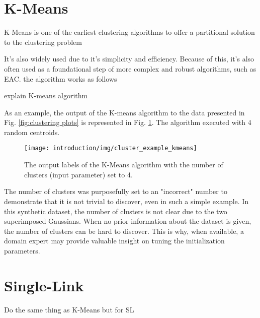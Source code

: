 \section{K-Means}

K-Means is one of the earliest clustering algorithms to offer a partitional solution to the clustering problem

It's also widely used due to it's simplicity and efficiency.
Because of this, it's also often used as a foundational step of more complex and robust algorithms, such as EAC.
 the algorithm works as follows

explain K-means algorithm

As an example, the output of the K-means algorithm to the data presented in Fig. \ref{fig:clustering plots} is represented in Fig. \ref{fig:intro kmeans}.
The algorithm executed with 4 random centroids.

\begin{figure}[hbtp]
\centering
\texttt{[image: introduction/img/cluster\_example\_kmeans]}
\caption{The output labels of the K-Means algorithm with the number of clusters (input parameter) set to 4.}
\label{fig:intro kmeans}\end{figure}

The number of clusters was purposefully set to an "incorrect" number to demonstrate that it is not trivial to discover, even in such a simple example.
In this synthetic dataset, the number of clusters is not clear due to the two superimposed Gaussians.
When no prior information about the dataset is given, the number of clusters can be hard to discover.
This is why, when available, a domain expert may provide valuable insight on tuning the initialization parameters.

\section{Single-Link}

Do the same thing as K-Means but for SL